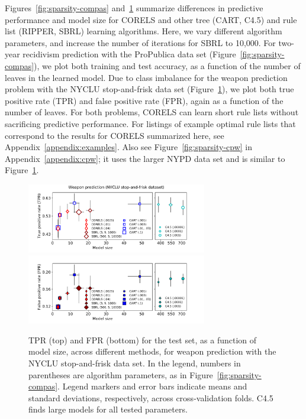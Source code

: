 \documentclass[twoside,11pt]{article}
\begin{document}
Figures~\ref{fig:sparsity-compas} and~\ref{fig:sparsity-weapon} summarize differences
in predictive performance and model size
for CORELS and other tree (CART, C4.5) and rule list (RIPPER, SBRL) learning algorithms.
%
Here, we vary different algorithm parameters, and increase the number of iterations for SBRL to 10,000.
%
For two-year recidivism prediction with the ProPublica data set (Figure~\ref{fig:sparsity-compas}),
we plot both training and test accuracy,
as a function of the number of leaves in the learned model.
%
Due to class imbalance for the weapon prediction problem with the NYCLU stop-and-frisk data set
(Figure~\ref{fig:sparsity-weapon}), we plot both true positive rate (TPR) and false positive rate (FPR),
again as a function of the number of leaves.
%
For both problems, CORELS can learn short rule lists without sacrificing predictive performance.
%
For listings of example optimal rule lists that correspond to the results
for CORELS summarized here, see Appendix~\ref{appendix:examples}.
%
Also see Figure~\ref{fig:sparsity-cpw} in Appendix~\ref{appendix:cpw}; it uses the larger
NYPD data set and is similar to Figure~\ref{fig:sparsity-weapon}.

\begin{figure}[t!]
\begin{center}
\includegraphics[trim={17mm, 0mm, 27mm, 0mm},
width=0.7\textwidth]{figs/weapon-sparsity-tpr.pdf}
\includegraphics[trim={17mm, 10mm, 27mm, 4mm},
width=0.7\textwidth]{figs/weapon-sparsity-fpr.pdf}
\end{center}
\caption{TPR (top) and FPR (bottom)
for the test set, as a function of model size, across different methods,
for weapon prediction with the NYCLU stop-and-frisk data set.
%
In the legend, numbers in parentheses are algorithm parameters,
as in Figure~\ref{fig:sparsity-compas}.
%
Legend markers and error bars indicate means and standard deviations,
respectively, across cross-validation folds.
%
%
C4.5 finds large models for all tested parameters.
}
\label{fig:sparsity-weapon}
\end{figure}
\end{document}
